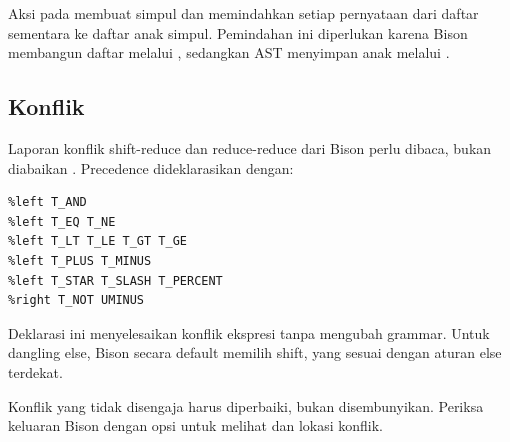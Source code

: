Aksi pada  membuat simpul  dan memindahkan
setiap pernyataan dari daftar sementara ke daftar anak simpul.
Pemindahan ini diperlukan karena Bison membangun daftar melalui
, sedangkan AST menyimpan anak melalui .

\subsection{Konflik}

Laporan konflik shift-reduce dan reduce-reduce dari Bison perlu
dibaca, bukan diabaikan \citep{thain2024}. Precedence dideklarasikan
dengan:
\begin{lstlisting}[language=Bison]
%left T_OR
%left T_AND
%left T_EQ T_NE
%left T_LT T_LE T_GT T_GE
%left T_PLUS T_MINUS
%left T_STAR T_SLASH T_PERCENT
%right T_NOT UMINUS
\end{lstlisting}
Deklarasi ini menyelesaikan konflik ekspresi tanpa mengubah grammar.
Untuk dangling else, Bison secara default memilih shift, yang sesuai
dengan aturan else terdekat.

\begin{warningbox}
Konflik yang tidak disengaja harus diperbaiki, bukan disembunyikan.
Periksa keluaran Bison dengan opsi  untuk melihat
 dan lokasi konflik.
\end{warningbox}

